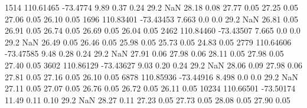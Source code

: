 1514   110.61465    -73.4774     9.89  0.37    0.24             29.2 NaN      28.18  0.08      27.77  0.05      27.25  0.05      27.06  0.05      26.10  0.05
1696   110.83401    -73.43453    7.663 0.0 0.0          29.2  NaN     26.81  0.05      26.91  0.05      26.74  0.05      26.69  0.05      26.04  0.05
2462   110.84460    -73.43507    7.665 0.0 0.0          29.2  NaN    26.49  0.05      26.46  0.05      25.98  0.05      25.73  0.05      24.83  0.05
2779   110.64606    -73.47585     9.48  0.28    0.24          29.2  NaN    27.91  0.06      27.98  0.06      28.11  0.05      27.98  0.05      27.40  0.05
3602   110.86129    -73.43627     9.03  0.20    0.24           29.2  NaN    28.06  0.09      27.98  0.06      27.81  0.05      27.16  0.05      26.10  0.05
6878   110.85936    -73.44916     8.498 0.0 0.0              29.2 NaN     27.11  0.05      27.07  0.05      26.76  0.05      26.72  0.05      26.11  0.05
10234  110.66501    -73.50174     11.49  0.11    0.10        29.2 NaN     28.27  0.11      27.23  0.05      27.73  0.05      28.08  0.05      27.90  0.05
